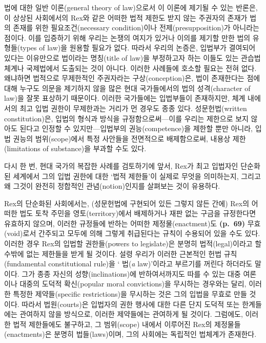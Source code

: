 법에 대한 일반 이론(general theory of law)으로서 이 이론에 제기될 수
있는 반론은, 이 상상된 사회에서의 Rex와 같은 어떠한 법적 제한도 받지
않는 주권자의 존재가 법의 존재를 위한 필요조건(necessary condition)이나
전제(presupposition)가 아니라는 점이다. 이를 입증하기 위해 우리는 논쟁의
여지가 있거나 이의를 제기할 만한 법의 유형들(types of law)을 원용할
필요가 없다. 따라서 우리의 논증은, 입법부가 결여되어 있다는 이유만으로
법이라는 명칭(title of law)을 부정하고자 하는 이들도 있는 관습법 체계나
국제법에서 도출되는 것이 아니다. 이러한 사례들에 호소할 필요는 전혀
없다. 왜냐하면 법적으로 무제한적인 주권자라는 구상(conception)은, 법이
존재한다는 점에 대해 누구도 의문을 제기하지 않을 많은 현대 국가들에서의
법의 성격(character of law)을 잘못 표상하기 때문이다. 이러한 국가들에는
입법부들이 존재하지만, 체계 내에서의 최고 입법 권한이 무제한과는 거리가
먼 경우도 종종 있다. 성문헌법(written constitution)은, 입법의 형식과
방식을 규정함으로써---이를 우리는 제한으로 보지 않아도 된다고 인정할 수
있지만---입법부의 권능(competence)을 제한할 뿐만 아니라, 입법 권능의
범위(scope)에서 특정 사안들을 전면적으로 배제함으로써, 내용상
제한(limitations of substance)을 부과할 수도 있다.

다시 한 번, 현대 국가의 복잡한 사례를 검토하기에 앞서, Rex가 최고
입법자인 단순화된 세계에서 그의 입법 권한에 대한 ‘법적 제한들’이 실제로
무엇을 의미하는지, 그리고 왜 그것이 완전히 정합적인 관념(notion)인지를
살펴보는 것이 유용하다.

Rex의 단순화된 사회에서는, (성문헌법에 구현되어 있든 그렇지 않든 간에)
Rex의 어떠한 법도 토착 주민을 영토(territory)에서 배제하거나 재판 없는
구금을 규정한다면 유효하지 않으며, 이러한 규정들에 반하는 어떠한
제정물(enactment)도 \textbf{(p.~69)} 무효(void)로서 간주되고 모두에 의해
그렇게 취급된다는 규칙이 수용되어 있을 수도 있다. 이러한 경우 Rex의
입법할 권한들(powers to legislate)은 분명히 법적(legal)이라고 할 수밖에
없는 제한들을 받게 될 것이다. 설령 우리가 이러한 근본적인 헌법
규칙(fundamental constitutional rule)을 ‘ 법(\emph{a}
law)’이라고 부르기를 꺼린다 하더라도 말이다. 그가 종종 자신의
성향(inclinations)에 반하여서까지도 따를 수 있는 대중 여론이나 대중의
도덕적 확신(popular moral convictions)을 무시하는 경우와는 달리, 이러한
특정한 제약들(specific restrictions)을 무시하는 것은 그의 입법을 무효로
만들 것이다. 따라서 법원(courts)은 입법자의 권한 행사에 대한 다른 단지
도덕적 또는  한계들에는 관여하지 않을 방식으로,
이러한 제약들에는 관여하게 될 것이다. 그럼에도, 이러한 법적 제한들에도
불구하고, 그 범위(scope) 내에서 이루어진 Rex의 제정물들(enactments)은
분명히 법들(laws)이며, 그의 사회에는 독립적인 법체계가 존재한다.

